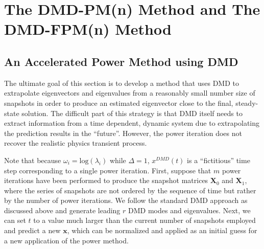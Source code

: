 \cleardoublepage

\chapter{The DMD-PM(n) Method and The DMD-FPM(n) Method}
\label{chapter:DMD-FPM(n)}

\section{An Accelerated Power Method using DMD}
\label{sec:dmdpi}
The ultimate goal of this section is to develop a method that uses DMD to extrapolate eigenvectors and eigenvalues from a reasonably small number size of snapshots in order to produce an estimated eigenvector close to the final, steady-state solution.
The difficult part of this strategy is that DMD itself needs to extract information from a time dependent, dynamic system due to extrapolating the prediction results in the ``future''.
However, the power iteration does not recover the realistic physics transient process. 

Note that because $\omega_i= \text{log}(\lambda_i)$ while $\Delta = 1$, $x^{DMD}(t)$ is a ``fictitious'' time step corresponding to a single power iteration.
First, suppose that $m$ power iterations have been performed to produce the snapshot matrices $\mathbf{X}_0$ and $\mathbf{X}_1$, where the series of snapshots are not ordered by the sequence of time but rather by the number of power iterations.
We follow the standard DMD approach as discussed above and generate leading $r$ DMD modes and eigenvalues.
Next, we can set $t$ to a value much larger than the current number of snapshots employed and predict a new $\mathbf{x}$, which can be normalized and applied as an initial guess for a new application of the power method.

